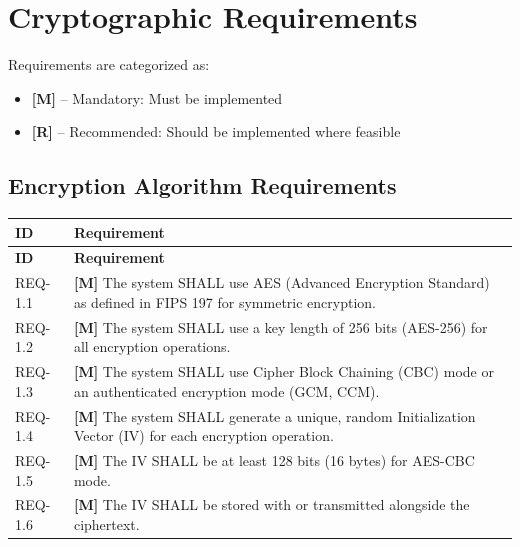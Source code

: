 \documentclass[11pt,letterpaper]{article}
\begin{document}
\section{Cryptographic Requirements}

Requirements are categorized as:
\begin{itemize}[topsep=4pt, itemsep=2pt]
    \item \textcolor{mandatory}{\textbf{[M]}} -- Mandatory: Must be implemented
    \item \textcolor{recommended}{\textbf{[R]}} -- Recommended: Should be implemented where feasible
\end{itemize}

\subsection{Encryption Algorithm Requirements}

\begin{longtable}{@{}p{1.2cm}p{12cm}@{}}
\toprule
\textbf{ID} & \textbf{Requirement} \\
\midrule
\endfirsthead
\toprule
\textbf{ID} & \textbf{Requirement} \\
\midrule
\endhead

REQ-1.1 & \textcolor{mandatory}{\textbf{[M]}} The system SHALL use AES (Advanced Encryption Standard) as defined in FIPS 197 for symmetric encryption. \\[6pt]

REQ-1.2 & \textcolor{mandatory}{\textbf{[M]}} The system SHALL use a key length of 256 bits (AES-256) for all encryption operations. \\[6pt]

REQ-1.3 & \textcolor{mandatory}{\textbf{[M]}} The system SHALL use Cipher Block Chaining (CBC) mode or an authenticated encryption mode (GCM, CCM). \\[6pt]

REQ-1.4 & \textcolor{mandatory}{\textbf{[M]}} The system SHALL generate a unique, random Initialization Vector (IV) for each encryption operation. \\[6pt]

REQ-1.5 & \textcolor{mandatory}{\textbf{[M]}} The IV SHALL be at least 128 bits (16 bytes) for AES-CBC mode. \\[6pt]

REQ-1.6 & \textcolor{mandatory}{\textbf{[M]}} The IV SHALL be stored with or transmitted alongside the ciphertext. \\[6pt]

\bottomrule
\end{longtable}
\end{document}
